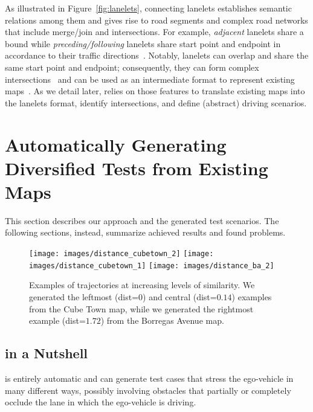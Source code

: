 \documentclass[conference]{IEEEtran}
\begin{document}
As illustrated in Figure~\ref{fig:lanelets}, connecting lanelets establishes semantic relations among them and gives rise to road segments and complex road networks that include merge/join and intersections. For example, \emph{adjacent} lanelets share a bound while \emph{preceding/following} lanelets share start point and endpoint in accordance to their traffic directions~\cite{althoff2018automatic}. Notably, lanelets can overlap and share the same start point and endpoint; consequently, they can form complex intersections~\cite{Althoff2017a} and can be used as an intermediate format to represent existing maps~\cite{althoff2018automatic}.
%
As we detail later, \tool relies on those features to translate existing maps into the lanelets format, identify intersections, and define (abstract) driving scenarios.

\section{Automatically Generating Diversified Tests from Existing Maps}
This section describes our approach and the generated test scenarios. The following sections, instead, summarize achieved results and found problems.

\begin{figure}[t]
\texttt{[image: images/distance\_cubetown\_2]}
\endminipage\hfill
{}
\texttt{[image: images/distance\_cubetown\_1]}
\endminipage\hfill
{}%
  \texttt{[image: images/distance\_ba\_2]}
\endminipage
\caption{Examples of trajectories at increasing levels of similarity. We generated the leftmost (dist=$0$) and central (dist=$0.14$) examples from the Cube Town map, while we generated the rightmost example (dist=$1.72$) from the Borregas Avenue map.}
\label{fig:similarity}
\end{figure}


\subsection{\tool in a Nutshell}
\tool is entirely automatic and can generate test cases that stress the ego-vehicle in many different ways, possibly involving obstacles that partially or completely occlude the lane in which the ego-vehicle is driving. 
\end{document}
